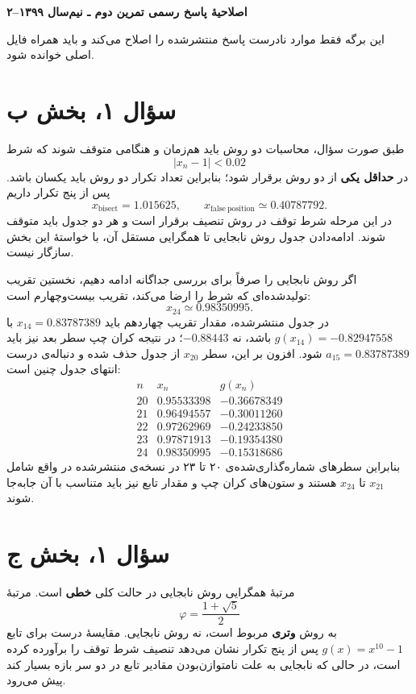 \documentclass[12pt]{article}
\begin{document}
\begin{center}
  {\Large\textbf{اصلاحیهٔ پاسخ رسمی تمرین دوم ـ نیم‌سال ۱۳۹۹--۲}}
\end{center}

این برگه فقط موارد نادرست پاسخ منتشرشده را اصلاح می‌کند و باید همراه فایل اصلی خوانده شود.

\section*{سؤال ۱، بخش ب}
طبق صورت سؤال، محاسبات دو روش باید هم‌زمان و هنگامی متوقف شوند که شرط
\[
  |x_n-1|<0.02
\]
در \textbf{حداقل یکی} از دو روش برقرار شود؛ بنابراین تعداد تکرار دو روش باید یکسان باشد. پس از پنج تکرار داریم
\[
  x_{\mathrm{bisect}}=1.015625,
  \qquad
  x_{\mathrm{false\ position}}\simeq0.40787792.
\]
در این مرحله شرط توقف در روش تنصیف برقرار است و هر دو جدول باید متوقف شوند. ادامه‌دادن جدول روش نابجایی تا همگرایی مستقل آن، با خواستهٔ این بخش سازگار نیست.

اگر روش نابجایی را صرفاً برای بررسی جداگانه ادامه دهیم، نخستین تقریب تولیدشده‌ای که شرط را ارضا می‌کند، تقریب بیست‌وچهارم است:
\[
  x_{24}\simeq0.98350995.
\]
در جدول منتشرشده، مقدار تقریب چهاردهم باید
\(x_{14}=0.83787389\)
با
\(g(x_{14})=-0.82947558\)
باشد، نه
\(-0.88443\)؛
در نتیجه کران چپ سطر بعد نیز باید
\(a_{15}=0.83787389\)
شود. افزون بر این، سطر
\(x_{20}\)
از جدول حذف شده و دنباله‌ی درست انتهای جدول چنین است:
\[
\begin{array}{c|cc}
n&x_n&g(x_n)\\ \hline
20&0.95533398&-0.36678349\\
21&0.96494557&-0.30011260\\
22&0.97262969&-0.24233850\\
23&0.97871913&-0.19354380\\
24&0.98350995&-0.15318686
\end{array}
\]
بنابراین سطرهای شماره‌گذاری‌شده‌ی ۲۰ تا ۲۳ در نسخه‌ی منتشرشده در واقع شامل
\(x_{21}\)
تا
\(x_{24}\)
هستند و ستون‌های کران چپ و مقدار تابع نیز باید متناسب با آن جابه‌جا شوند.

\section*{سؤال ۱، بخش ج}
مرتبهٔ همگرایی روش نابجایی در حالت کلی \textbf{خطی} است. مرتبهٔ
\[
  \varphi=\frac{1+\sqrt5}{2}
\]
به روش \textbf{وتری} مربوط است، نه روش نابجایی. مقایسهٔ درست برای تابع
\(g(x)=x^{10}-1\)
پس از پنج تکرار نشان می‌دهد تنصیف شرط توقف را برآورده کرده است، در حالی که نابجایی به علت نامتوازن‌بودن مقادیر تابع در دو سر بازه بسیار کند پیش می‌رود.
\end{document}
